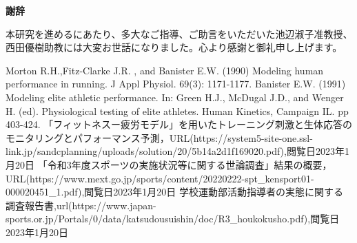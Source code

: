 \documentclass[12pt,fleqn]{jreport}
\begin{document}
\newpage
\begin{flushleft}
  {\Huge\textbf{謝辞}}
\end{flushleft}
\vspace{2cm}
本研究を進めるにあたり、多大なご指導、ご助言をいただいた池辺淑子准教授、西田優樹助教には大変お世話になりました。心より感謝と御礼申し上げます。
\newpage
\begin{thebibliography}{99}
  Morton R.H.,Fitz-Clarke J.R. , and Banister E.W. (1990) Modeling human performance in running. J Appl Physiol. 69(3): 1171-1177.
  Banister E.W. (1991) Modeling elite athletic performance. In: Green H.J., McDugal J.D., and Wenger H. (ed). Physiological testing of elite athletes. Human Kinetics, Campaign IL. pp 403-424.
  「フィットネスー疲労モデル」を用いたトレーニング刺激と生体応答のモニタリングとパフォーマンス予測，URL(https://system5-site-one.ssl-link.jp/sandcplanning/uploads/solution/20/5b14a2d1f169020.pdf),閲覧日2023年1月20日
  「令和3年度スポーツの実施状況等に関する世論調査」結果の概要，URL(https://www.mext.go.jp/sports/content/20220222-spt\_kensport01-000020451\_1.pdf),閲覧日2023年1月20日
  学校運動部活動指導者の実態に関する調査報告書,url(https://www.japan-sports.or.jp/Portals/0/data/katsudousuishin/doc/R3\_houkokusho.pdf),閲覧日2023年1月20日
\end{thebibliography}
\end{document}
